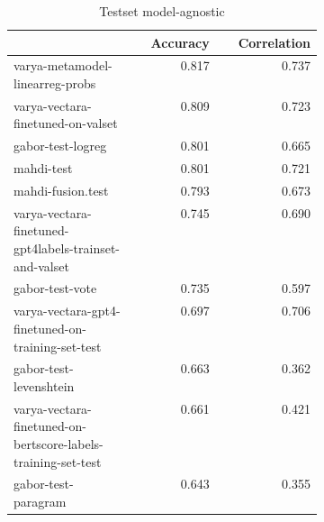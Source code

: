 \begin{table}
\centering
\caption{Testset model-agnostic}
\label{test-agnostic}
\begin{tabular}{|p{0.4\linewidth}|r|r|}
\hline
 & Accuracy & Correlation \\
\hline
varya-metamodel-linearreg-probs & 0.817 & 0.737 \\
\cline{1-3}
varya-vectara-finetuned-on-valset & 0.809 & 0.723 \\
\cline{1-3}
gabor-test-logreg & 0.801 & 0.665 \\
\cline{1-3}
mahdi-test & 0.801 & 0.721 \\
\cline{1-3}
mahdi-fusion.test & 0.793 & 0.673 \\
\cline{1-3}
varya-vectara-finetuned-gpt4labels-trainset-and-valset & 0.745 & 0.690 \\
\cline{1-3}
gabor-test-vote & 0.735 & 0.597 \\
\cline{1-3}
varya-vectara-gpt4-finetuned-on-training-set-test & 0.697 & 0.706 \\
\cline{1-3}
gabor-test-levenshtein & 0.663 & 0.362 \\
\cline{1-3}
varya-vectara-finetuned-on-bertscore-labels-training-set-test & 0.661 & 0.421 \\
\cline{1-3}
gabor-test-paragram & 0.643 & 0.355 \\
\cline{1-3}
\hline
\end{tabular}
\end{table}
